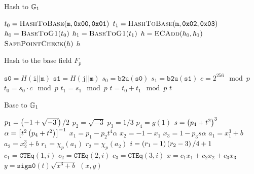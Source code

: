 \begin{algorithm}[tp]
\caption{Hash to $\mathbb{G}_{1}$}
\label{alg:hash-to-G1}
\begin{algorithmic}[1]
    \State $t_{0} = \textsc{HashToBase}(\texttt{m},\texttt{0x00},\texttt{0x01})$
    \State $t_{1} = \textsc{HashToBase}(\texttt{m},\texttt{0x02},\texttt{0x03})$
    \State $h_{0} = \textsc{BaseToG1}(t_{0})$
    \State $h_{1} = \textsc{BaseToG1}(t_{1})$
    \State $h = \textsc{ECAdd}(h_{0},h_{1})$
    \State $\textsc{SafePointCheck}(h)$
        \label{alg_line:safe_point_check}
    \State \Return $h$
\EndFunction
\end{algorithmic}
\end{algorithm}

\begin{algorithm}[tp]
\caption{Hash to the base field $F_{p}$}
\label{alg:hash-to-fp}
\begin{algorithmic}[1]
    \State $\texttt{s0} = H(\texttt{i}||\texttt{m})$
    \State $\texttt{s1} = H(\texttt{j}||\texttt{m})$
    \State $s_{0} = \texttt{b2u}(\texttt{s0})$
    \State $s_{1} = \texttt{b2u}(\texttt{s1})$
    \State $c = 2^{256} \mod p$
    \State $t_{0} = s_{0}\cdot c \mod p$
    \State $t_{1} = s_{1} \mod p$
    \State $t = t_{0} + t_{1} \mod p$
    \State \Return $t$
\EndFunction
\end{algorithmic}
\end{algorithm}

\begin{algorithm}[tp]
\caption{Base to $\mathbb{G}_{1}$}
\label{alg:base-to-G1}
\begin{algorithmic}[1]
    \State $p_{1} = \parens{-1+\sqrt{-3}}/2$
    \State $p_{2} = \sqrt{-3}$
    \State $p_{3} = 1/3$
    \State $p_{4} = g(1)$
    \State $s = \left( p_{4}+ t^{2} \right)^{3}$
    \State $\alpha = \left[ t^{2}\left( p_{4} + t^{2} \right) \right]^{-1}$
        \label{alg_line:alpha_def}
    \State $x_{1} = p_{1} - p_{2}t^{4}\alpha$
    \State $x_{2} = -1 - x_{1}$
    \State $x_{3} = 1 - p_{3}s\alpha$
    \State $a_{1} = x_{1}^{3} + b$
    \State $a_{2} = x_{2}^{3} + b$
    \State $r_{1} = \chi_{p}(a_{1})$
    \State $r_{2}  = \chi_{p}(a_{2})$
    \State $i = \left( r_{1}-1 \right)\left( r_{2}-3 \right)/4 + 1$
        \label{alg_line:new_coef_func}
    \State $c_{1} = \texttt{CTEq}(1,i)$
    \State $c_{2} = \texttt{CTEq}(2,i)$
    \State $c_{3} = \texttt{CTEq}(3,i)$
    \State $x = c_{1}x_{1} + c_{2}x_{2} + c_{3}x_{3}$
    \State $y = \texttt{sign0}(t)\sqrt{x^{3}+b}$
    \State \Return $(x, y)$
\EndFunction
\end{algorithmic}
\end{algorithm}
